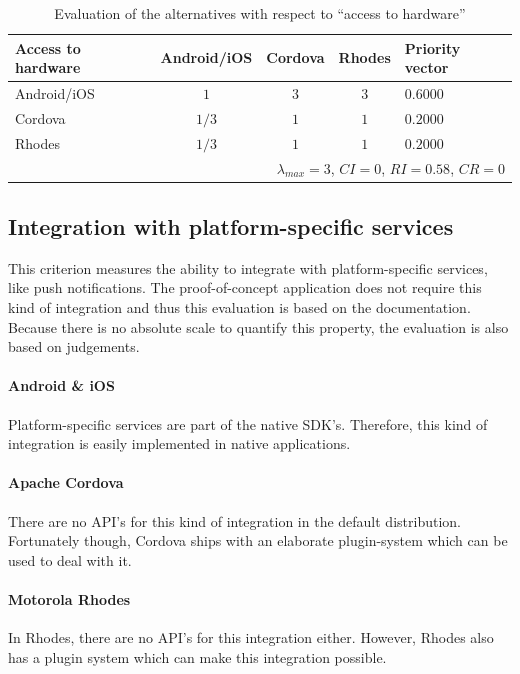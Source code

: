 \begin{table}[h!]
    \centering
    \begin{tabular}{lcccl}
        \hline
        \textbf{Access to hardware} & Android/iOS & Cordova & Rhodes & Priority vector \\
        \hline
        Android/iOS          & $1$         & $3$     & $3$   & $0.6000$        \\
        Cordova              & $1/3$       & $1$     & $1$   & $0.2000$        \\
        Rhodes               & $1/3$       & $1$     & $1$   & $0.2000$        \\
        \hline
        \multicolumn{5}{r}{$\lambda_{max} = 3$, $CI = 0$, $RI = 0.58$, $CR = 0$}\\
        \hline
    \end{tabular}
    \caption{Evaluation of the alternatives with respect to ``access to hardware''}
    \label{tab:hwaccess}
\end{table}

\subsection{Integration with platform-specific services}

This criterion measures the ability to integrate with platform-specific services, like push notifications. The proof-of-concept application does not require this kind of integration and thus this evaluation is based on the documentation. Because there is no absolute scale to quantify this property, the evaluation is also based on judgements.

\paragraph{Android \& iOS} Platform-specific services are part of the native SDK's. Therefore, this kind of integration is easily implemented in native applications.

\paragraph{Apache Cordova} There are no API's for this kind of integration in the default distribution. Fortunately though, Cordova ships with an elaborate plugin-system which can be used to deal with it.

\paragraph{Motorola Rhodes} In Rhodes, there are no API's for this integration either. However, Rhodes also has a plugin system which can make this integration possible. 

